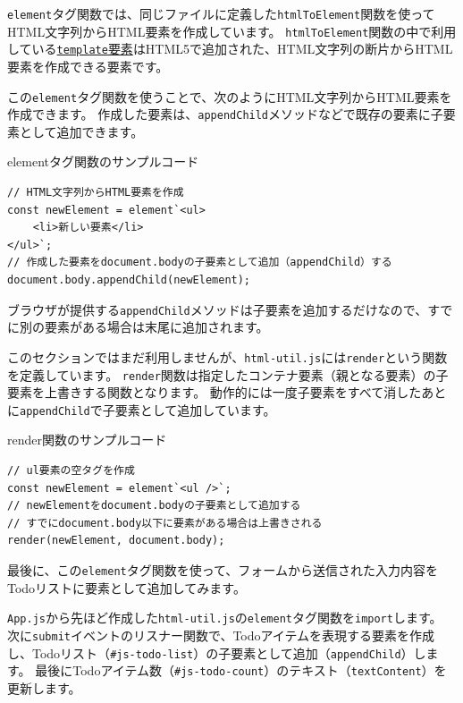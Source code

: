 \texttt{element}タグ関数では、同じファイルに定義した\texttt{htmlToElement}関数を使ってHTML文字列からHTML要素を作成しています。
\texttt{htmlToElement}関数の中で利用している\href{https://developer.mozilla.org/ja/docs/Web/HTML/Element/template}{\texttt{template}要素}はHTML5で追加された、HTML文字列の断片からHTML要素を作成できる要素です。

この\texttt{element}タグ関数を使うことで、次のようにHTML文字列からHTML要素を作成できます。
作成した要素は、\texttt{appendChild}メソッドなどで既存の要素に子要素として追加できます。

\begin{listtitle}
elementタグ関数のサンプルコード
\end{listtitle}
\begin{lstlisting}
// HTML文字列からHTML要素を作成
const newElement = element`<ul>
    <li>新しい要素</li>
</ul>`;
// 作成した要素をdocument.bodyの子要素として追加（appendChild）する
document.body.appendChild(newElement);
\end{lstlisting}
\listend

ブラウザが提供する\texttt{appendChild}メソッドは子要素を追加するだけなので、すでに別の要素がある場合は末尾に追加されます。

このセクションではまだ利用しませんが、\texttt{html-util.js}には\texttt{render}という関数を定義しています。
\texttt{render}関数は指定したコンテナ要素（親となる要素）の子要素を上書きする関数となります。
動作的には一度子要素をすべて消したあとに\texttt{appendChild}で子要素として追加しています。

\begin{listtitle}
render関数のサンプルコード
\end{listtitle}
\begin{lstlisting}
// ul要素の空タグを作成
const newElement = element`<ul />`;
// newElementをdocument.bodyの子要素として追加する
// すでにdocument.body以下に要素がある場合は上書きされる
render(newElement, document.body);
\end{lstlisting}
\listend

最後に、この\texttt{element}タグ関数を使って、フォームから送信された入力内容をTodoリストに要素として追加してみます。

\texttt{App.js}から先ほど作成した\texttt{html-util.js}の\texttt{element}タグ関数を\texttt{import}します。
次に\texttt{submit}イベントのリスナー関数で、Todoアイテムを表現する要素を作成し、Todoリスト（\texttt{\#js-todo-list}）の子要素として追加（\texttt{appendChild}）します。
最後にTodoアイテム数（\texttt{\#js-todo-count}）のテキスト（\texttt{textContent}）を更新します。

